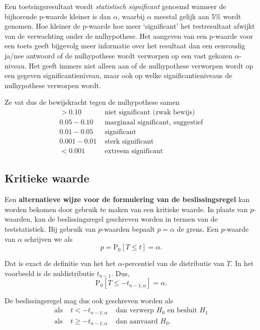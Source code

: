 \documentclass[
  12pt,dutch,coursenotes]{book}
\theoremstyle{definition}
\theoremstyle{definition}
\theoremstyle{definition}
\theoremstyle{remark}
\begin{document}
Een toetsingsresultaat wordt \emph{statistisch significant} genoemd
wanneer de bijhorende p-waarde kleiner is dan \(\alpha\), waarbij \(\alpha\)
meestal gelijk aan 5\% wordt genomen. Hoe kleiner de p-waarde hoe meer
`significant' het testresultaat afwijkt van de verwachting onder de
nulhypothese. Het aangeven van een p-waarde voor een toets geeft bijgevolg
meer informatie over het resultaat dan een eenvoudig ja/nee antwoord of de
nulhypothese wordt verworpen op een vast gekozen \(\alpha\)-niveau. Het geeft immers niet alleen aan of de nulhypothese verworpen wordt op een gegeven significantieniveau, maar ook op welke significantieniveaus de nulhypothese verworpen wordt.

Ze vat dus de bewijskracht tegen de nulhypothese samen
\[\begin{array}{cl}>0.10 & \text{ niet significant (zwak bewijs)}\\0.05-0.10 & \text{ marginaal significant, suggestief}\\0.01-0.05 & \text{ significant}\\0.001-0.01 & \text{ sterk significant}\\<0.001 & \text{ extreem significant}\end{array}\]

\hypertarget{kritieke-waarde}{%
\subsection{Kritieke waarde}\label{kritieke-waarde}}

Een \textbf{alternatieve wijze voor de formulering van de beslissingsregel} kan worden bekomen door gebruik te maken van een kritieke waarde.
In plaats van \(p\)-waarden, kan de beslissingsregel geschreven worden in termen van de teststatistiek.
Bij gebruik van \(p\)-waarden bepaalt \(p=\alpha\) de grens.
Een \(p\)-waarde van \(\alpha\) schrijven we als
\[p=\text{P}_0 \left[ T \leq t \right]=\alpha.\]

Dat is exact de definitie van het het \(\alpha\)-percentiel van de distributie van \(T\).
In het voorbeeld is de nuldistributie \(t_{n-1}\).
Dus,\[\text{P}_0\left[T\leq -t_{n-1;\alpha}\right]=\alpha.\]

De beslissingsregel mag dus ook geschreven worden als
\begin{eqnarray*}
\text{als } & t< -t_{n-1;\alpha} & \text{ dan verwerp }H_0\text{ en besluit }H_1 \\
  \text{als } & t\geq -t_{n-1;\alpha} & \text{ dan aanvaard }H_0.
\end{eqnarray*}
\end{document}
